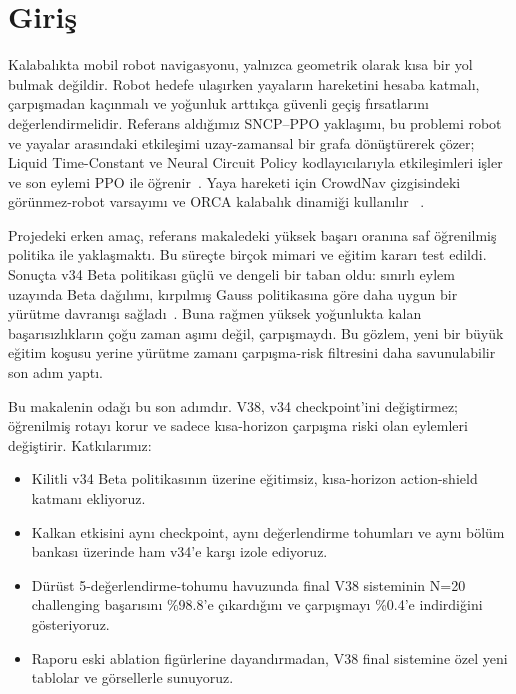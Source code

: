 \documentclass[conference]{IEEEtran}
\begin{document}
\section{Giriş}
Kalabalıkta mobil robot navigasyonu, yalnızca geometrik olarak kısa bir yol bulmak değildir. Robot hedefe
ulaşırken yayaların hareketini hesaba katmalı, çarpışmadan kaçınmalı ve yoğunluk arttıkça güvenli geçiş
fırsatlarını değerlendirmelidir. Referans aldığımız SNCP--PPO yaklaşımı, bu problemi robot ve yayalar
arasındaki etkileşimi uzay-zamansal bir grafa dönüştürerek çözer; Liquid Time-Constant ve Neural Circuit
Policy kodlayıcılarıyla etkileşimleri işler ve son eylemi PPO ile öğrenir~\cite{ao2026sncp,hasani2021ltc,lechner2020ncp,schulman2017ppo}.
Yaya hareketi için CrowdNav çizgisindeki görünmez-robot varsayımı ve ORCA kalabalık dinamiği kullanılır
~\cite{chen2019crowdnav,vandenberg2011orca}.

Projedeki erken amaç, referans makaledeki yüksek başarı oranına saf öğrenilmiş politika ile yaklaşmaktı.
Bu süreçte birçok mimari ve eğitim kararı test edildi. Sonuçta v34 Beta politikası güçlü ve dengeli bir taban
oldu: sınırlı eylem uzayında Beta dağılımı, kırpılmış Gauss politikasına göre daha uygun bir yürütme davranışı
sağladı~\cite{chou2017beta}. Buna rağmen yüksek yoğunlukta kalan başarısızlıkların çoğu zaman aşımı değil,
çarpışmaydı. Bu gözlem, yeni bir büyük eğitim koşusu yerine yürütme zamanı çarpışma-risk filtresini daha
savunulabilir son adım yaptı.

Bu makalenin odağı bu son adımdır. V38, v34 checkpoint'ini değiştirmez; öğrenilmiş rotayı korur ve sadece
kısa-horizon çarpışma riski olan eylemleri değiştirir. Katkılarımız:
\begin{itemize}
\item Kilitli v34 Beta politikasının üzerine eğitimsiz, kısa-horizon action-shield katmanı ekliyoruz.
\item Kalkan etkisini aynı checkpoint, aynı değerlendirme tohumları ve aynı bölüm bankası üzerinde ham v34'e
karşı izole ediyoruz.
\item Dürüst 5-değerlendirme-tohumu havuzunda final V38 sisteminin N=20 challenging başarısını \%98.8'e
çıkardığını ve
çarpışmayı \%0.4'e indirdiğini gösteriyoruz.
\item Raporu eski ablation figürlerine dayandırmadan, V38 final sistemine özel yeni tablolar ve görsellerle
sunuyoruz.
\end{itemize}
\end{document}
